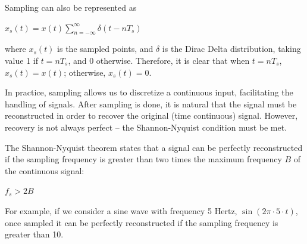 \documentclass{article}
\begin{document}
Sampling can also be represented as 
\begin{center}
    \begin{math}
        x_s(t) = x(t) \displaystyle\sum_{n=-\infty}^{\infty} \delta (t-nT_s)
    \end{math}  
\end{center}
where $x_s(t)$ is the sampled points, and $\delta$ is the Dirac Delta distribution, taking value 1 if $t=nT_s$, and 0 otherwise.
Therefore, it is clear that when $t=nT_s$, $x_s(t) = x(t)$; otherwise, $x_s(t) = 0$. 

In practice, sampling allows us to discretize a continuous input, facilitating the handling of signals. After sampling is done, it is natural that the signal must be reconstructed in order to recover the original (time continuous) signal.
However, recovery is not always perfect -- the Shannon-Nyquist condition must be met.

The Shannon-Nyquist theorem states that a signal can be perfectly reconstructed if the sampling frequency is greater than two times the maximum frequency $B$ of the continuous signal:
\begin{center}
    \begin{math}
        f_s > 2B
    \end{math}  
\end{center}
For example, if we consider a sine wave with frequency 5 Hertz, $\sin(2\pi \cdot 5 \cdot t)$, once sampled it can be perfectly reconstructed if the sampling frequency is greater than 10.

\end{document}
